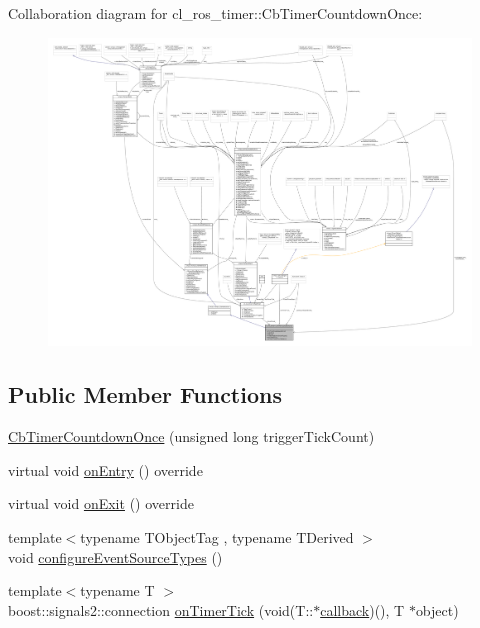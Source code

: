 Collaboration diagram for cl\+\_\+ros\+\_\+timer\+:\+:Cb\+Timer\+Countdown\+Once\+:
\nopagebreak
\begin{figure}[H]
\begin{center}
\leavevmode
\includegraphics[width=350pt]{classcl__ros__timer_1_1CbTimerCountdownOnce__coll__graph}
\end{center}
\end{figure}
\subsection*{Public Member Functions}
\begin{DoxyCompactItemize}
\item 
\hyperlink{classcl__ros__timer_1_1CbTimerCountdownOnce_a41161c36e1c3b1767c02884d28649ccd}{Cb\+Timer\+Countdown\+Once} (unsigned long trigger\+Tick\+Count)
\item 
virtual void \hyperlink{classcl__ros__timer_1_1CbTimerCountdownOnce_a613662c4a4106ece0ce1dee198d1aba2}{on\+Entry} () override
\item 
virtual void \hyperlink{classcl__ros__timer_1_1CbTimerCountdownOnce_ab602b778a299b42e8cc9f4bf3da0a234}{on\+Exit} () override
\item 
{\footnotesize template$<$typename T\+Object\+Tag , typename T\+Derived $>$ }\\void \hyperlink{classcl__ros__timer_1_1CbTimerCountdownOnce_a12c63ab8ca0d90859f6b7fc1212b504e}{configure\+Event\+Source\+Types} ()
\item 
{\footnotesize template$<$typename T $>$ }\\boost\+::signals2\+::connection \hyperlink{classcl__ros__timer_1_1CbTimerCountdownOnce_a1e20a8c9a9907db8a1d7dacf8c60ad27}{on\+Timer\+Tick} (void(T\+::$\ast$\hyperlink{3_2servers_2opencv__perception__node_2opencv__perception__node_8cpp_a050e697bd654facce10ea3f6549669b3}{callback})(), T $\ast$object)
\end{DoxyCompactItemize}
